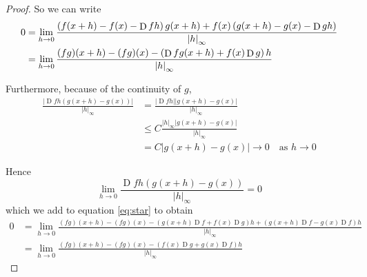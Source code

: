 \documentclass[letterpaper,11pt]{article}
\DeclareMathOperator{\D}{D}
\newcommand{\as}{\quad\text{as }}
\newcommand{\norm}[1]{\left|#1\right|}
\newcommand{\inftynorm}[1]{\norm{#1}_\infty}
\newcommand{\parens}[1]{\left(#1\right)}
\begin{document}
\begin{enumerate}
\begin{proof}
            So we can write
            \begin{align}
                0 &=
                \lim_{h \to 0} {
                    \frac{
                        \parens{ f(x + h) - f(x) - \D{f}h } g(x + h)
                        +
                        f(x) \parens{ g(x + h) - g(x) - \D{g}h }
                    }{
                        \inftynorm{h}
                    }
                } \notag \\
                &= \lim_{h \to 0} {
                    \frac{
                        (fg)(x + h) - (fg)(x) - \parens{
                            \D{f} g(x + h) + f(x) \D{g}
                        } h
                    }{
                        \inftynorm{h}
                    }
                }
                \label{eq:star}
            \end{align}

            Furthermore, because of the continuity of $g$,
            \begin{align*}
                \frac{
                    \norm{\D{f} h \parens{ g(x + h) - g(x) }}
                }{
                    \inftynorm{h}
                }
                &=
                \frac{
                    \norm{\D{f} h} \norm{ g(x + h) - g(x) }
                }{
                    \inftynorm{h}
                } \\
                &\leq
                C
                \frac{
                    \inftynorm{h}
                    \norm{ g(x + h) - g(x) }
                }{
                    \inftynorm{h}
                } \\
                &= C \norm{g(x + h) - g(x) } \to 0 \as h \to 0
            \end{align*}

            Hence
            \begin{equation*}
                \lim_{h \to 0} {
                    \frac{
                        \D{f} h \parens{ g(x + h) - g(x) }
                    }{
                        \inftynorm{h}
                    }
                } = 0
            \end{equation*}
            which we add to equation \ref{eq:star} to obtain
            \begin{align*}
                0 &=
                \lim_{h \to 0} {
                    \frac{
                        (fg)(x + h)
                        - (fg)(x)
                        - \parens{ g(x + h) \D{f} + f(x) \D{g} } h
                        + \parens{ g(x + h) \D{f} - g(x) \D{f} } h
                    }{
                        \inftynorm{h}
                    }
                } \\
                &=
                \lim_{h \to 0} {
                    \frac{
                        (fg)(x + h)
                        - (fg)(x)
                        - \parens{f(x) \D{g} + g(x) \D{f}} h
                    }{
                        \inftynorm{h}
                    }
                }
            \end{align*}


\end{proof}
\end{enumerate}
\end{document}
